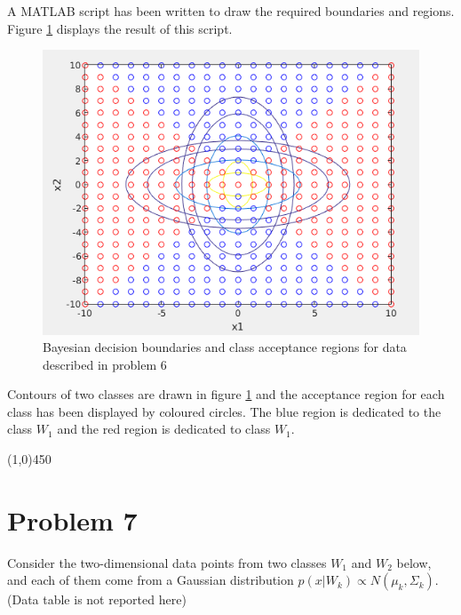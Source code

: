 \documentclass[12pt]{article}
\begin{document}
A MATLAB script has been written to draw the required boundaries and regions. Figure \ref{fig:6-1} displays the result of this script.

\begin{figure}[h]
\centering
\includegraphics[scale=0.5]{Imgs/6.png}
\caption{Bayesian decision boundaries and class acceptance regions for data described in problem 6}
\label{fig:6-1}
\end{figure}

Contours of two classes are drawn in figure \ref{fig:6-1} and the acceptance region for each class has been displayed by coloured circles. The blue region is dedicated to the class $W_1$ and the red region is dedicated to class $W_1$.

\begin{center}
\line(1,0){450}
\end{center}


\section{Problem 7}
Consider the two-dimensional data points from two classes $W_1$ and $W_2$ below, and each of
them come from a Gaussian distribution $p ( x | W_k ) \propto N ( \mu_k , \Sigma_k )$. (Data table is not reported here)
\end{document}

